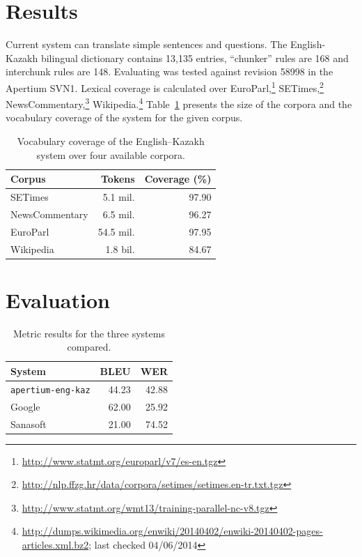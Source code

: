 \documentclass[11pt]{article}
\begin{document}
\section{Results}

Current system can translate simple sentences and questions. The English-Kazakh bilingual dictionary 
contains 13,135 entries, ``chunker'' rules are 168 and interchunk rules are 148. 
Evaluating was tested against  revision 58998 in the Apertium SVN1. Lexical coverage is calculated 
over EuroParl,\footnote{\url{http://www.statmt.org/europarl/v7/es-en.tgz}} SETimes,\footnote{\url{http://nlp.ffzg.hr/data/corpora/setimes/setimes.en-tr.txt.tgz}} NewsCommentary,\footnote{\url{http://www.statmt.org/wmt13/training-parallel-nc-v8.tgz}} Wikipedia.\footnote{\url{http://dumps.wikimedia.org/enwiki/20140402/enwiki-20140402-pages-articles.xml.bz2}; last checked 04/06/2014} 
Table~\ref{table:coverage} presents the size of the corpora and the vocabulary coverage of the system for the given corpus.

\begin{table}
  \centering
  \begin{tabular}{|l|r|r|}
    \hline
    \textbf{Corpus} & \textbf{Tokens} & \textbf{Coverage} (\%) \\
    \hline
    SETimes & 5.1 mil. & 97.90 \\
    NewsCommentary & 6.5 mil. & 96.27 \\
    EuroParl & 54.5 mil. & 97.95 \\
    Wikipedia & 1.8 bil. & 84.67 \\
    \hline
  \end{tabular}
  \caption{Vocabulary coverage of the English--Kazakh system over four available corpora.}
  \label{table:coverage}
\end{table}

\section{Evaluation}

\begin{table}
  \centering
  \begin{tabular}{|l|r|r|}
    \hline
    \textbf{System} & \textbf{BLEU} & \textbf{WER} \\
    \hline
    \texttt{apertium-eng-kaz} & 44.23 & 42.88 \\
    Google & 62.00 & 25.92 \\
    Sanasoft & 21.00 & 74.52 \\
    \hline
  \end{tabular}
  \caption{Metric results for the three systems compared.}
  \label{table:metrics}
\end{table}
\end{document}
